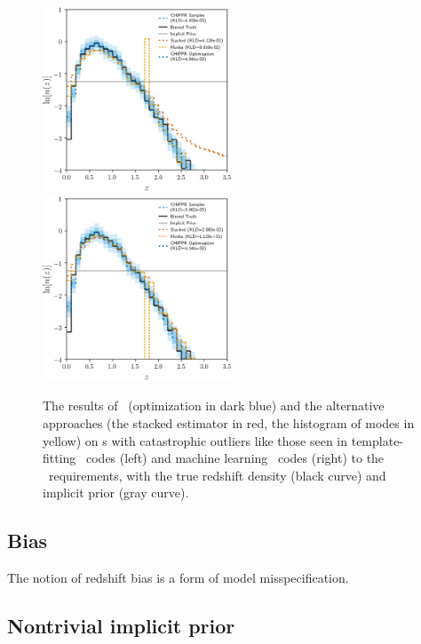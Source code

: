 \begin{figure}
	\includegraphics[width=0.5\textwidth]{figures/chippr/thesis_eout_log_estimators.png}
	\includegraphics[width=0.5\textwidth]{figures/chippr/thesis_rout_log_estimators.png}
	\caption{
		The results of \Chippr\ (optimization in dark blue) and the alternative approaches (the stacked estimator in red, the histogram of modes in yellow) on \pzpdf s with catastrophic outliers like those seen in template-fitting \pzpdf\ codes (left) and machine learning \pzpdf\ codes (right) to the \lsst\ requirements, with the true redshift density (black curve) and implicit prior (gray curve).
	}
\end{figure}

\subsection{Bias}

The notion of redshift bias is a form of model misspecification.

\subsection{Nontrivial implicit prior}

